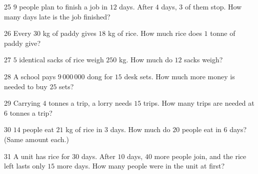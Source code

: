 \gap
\begin{probbox}{25}{\relax}
$9$ people plan to finish a job in $12$ days. After $4$ days, $3$ of them stop. How many days late is the job finished?
\end{probbox}
\gap
\begin{probbox}{26}{\relax}
Every $30$ kg of paddy gives $18$ kg of rice. How much rice does $1$ tonne of paddy give?
\end{probbox}
\gap
\begin{probbox}{27}{\relax}
$5$ identical sacks of rice weigh $250$ kg. How much do $12$ sacks weigh?
\end{probbox}
\gap
\begin{probbox}{28}{\relax}
A school pays $9\,000\,000$ dong for $15$ desk sets. How much more money is needed to buy $25$ sets?
\end{probbox}
\gap
\begin{probbox}{29}{\relax}
Carrying $4$ tonnes a trip, a lorry needs $15$ trips. How many trips are needed at $6$ tonnes a trip?
\end{probbox}
\gap
\begin{probbox}{30}{\relax}
$14$ people eat $21$ kg of rice in $3$ days. How much do $20$ people eat in $6$ days? (Same amount each.)
\end{probbox}
\begin{probbox}{31}{}
A unit has rice for $30$ days. After $10$ days, $40$ more people join, and the rice left lasts only $15$ more days. How many people were in the unit at first?
\end{probbox}
